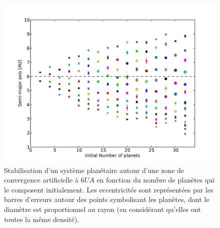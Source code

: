 \begin{figure}[htb]
\centering
\includegraphics[width=0.75\linewidth]{figure/MMR_number.pdf}
\caption{Stabilisation d'un système planétaire autour d'une zone de convergence artificielle à $6\unit{UA}$ en fonction du nombre de planètes qui le composent initialement. Les eccentricités sont représentées par les barres d'erreurs autour des points symbolisant les planètes, dont le diamètre est proportionnel au rayon (en considérant qu'elles ont toutes la même densité).}\label{fig:MMR_number}
\end{figure}
